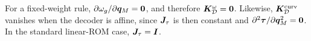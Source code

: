\documentclass[preprint,10pt]{elsarticle}  %
\begin{document}
For a fixed-weight rule,
\(\partial\omega_{g}/\partial\bm{q}_M=\bm{0}\), and therefore
\(\bm{K}_{\mathcal{D}}^{\omega}=\bm{0}\). Likewise, \(\bm{K}_{\mathcal{D}}^{\mathrm{curv}}\) vanishes when the decoder is
affine, since \(\bm{J}_{\tau}\) is then constant and
\(\partial^2\bm{\tau}/\partial\bm{q}_M^2=\bm{0}\). In the standard linear-ROM
case, \(\bm{J}_{\tau}=\bm{I}\).









\end{document}
